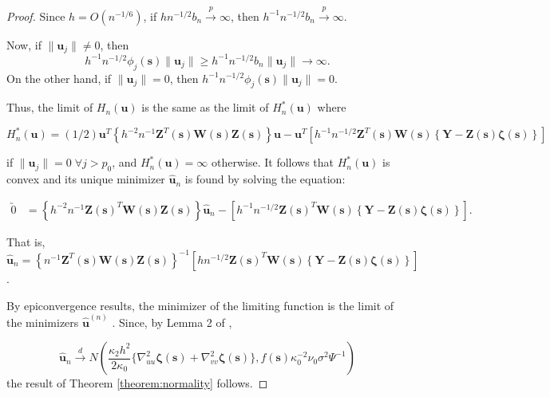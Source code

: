\documentclass[authoryear,review, 12pt]{elsarticle}
\begin{document}
\begin{proof}
Since $h=O(n^{-1/6})$, if $hn^{-1/2}b_{n}\xrightarrow{p}\infty$,
then $h^{-1}n^{-1/2}b_{n}\xrightarrow{p}\infty$.

Now, if $\|\bm{u}_{j}\|\ne0$, then 
\[
h^{-1}n^{-1/2}\phi_{j}(\bm{s})\|\bm{u}_{j}\|\ge h^{-1}n^{-1/2}b_{n}\|\bm{u}_{j}\|\to\infty.
\]
On the other hand, if $\|\bm{u}_{j}\|=0$, then $h^{-1}n^{-1/2}\phi_{j}(\bm{s})\|\bm{u}_{j}\|=0$.

Thus, the limit of $H_{n}\left(\bm{u}\right)$ is the same as the
limit of $H_{n}^{*}\left(\bm{u}\right)$ where

\[
H_{n}^{*}\left(\bm{u}\right)=(1/2)\bm{u}^{T}\left\{ h^{-2}n^{-1}\bm{Z}^{T}(\bm{s})\bm{W}(\bm{s})\bm{Z}(\bm{s})\right\} \bm{u}-\bm{u}^{T}\left[h^{-1}n^{-1/2}\bm{Z}^{T}(\bm{s})\bm{W}(\bm{s})\left\{ \bm{Y}-\bm{Z}(\bm{s})\bm{\zeta}(\bm{s})\right\} \right]
\]


if $\|\bm{u}_{j}\|=0\;\forall j>p_{0}$, and $H_{n}^{*}\left(\bm{u}\right)=\infty$
otherwise. It follows that $H_{n}^{*}\left(\bm{u}\right)$ is convex
and its unique minimizer $\hat{\bm{u}}_{n}$ is found by solving the
equation:

\begin{align}
\utilde{0} & =\left\{ h^{-2}n^{-1}\bm{Z}\left(\bm{s}\right)^{T}\bm{W}\left(\bm{s}\right)\bm{Z}\left(\bm{s}\right)\right\} \hat{\bm{u}}_{n}-\left[h^{-1}n^{-1/2}\bm{Z}\left(\bm{s}\right)^{T}\bm{W}\left(\bm{s}\right)\left\{ \bm{Y}-\bm{Z}\left(\bm{s}\right)\bm{\zeta}\left(\bm{s}\right)\right\} \right].\label{eq:limit}
\end{align}


That is, $\hat{\bm{u}}_{n}=\left\{ n^{-1}\bm{Z}^{T}\left(\bm{s}\right)\bm{W}\left(\bm{s}\right)\bm{Z}\left(\bm{s}\right)\right\} ^{-1}\left[hn^{-1/2}\bm{Z}\left(\bm{s}\right)^{T}\bm{W}\left(\bm{s}\right)\left\{ \bm{Y}-\bm{Z}\left(\bm{s}\right)\bm{\zeta}\left(\bm{s}\right)\right\} \right]$.

By epiconvergence results, the minimizer of the limiting function
is the limit of the minimizers $\hat{\bm{u}}^{(n)}$ \citep{Geyer-1994,Knight-Fu-2000}.
Since, by Lemma 2 of \citet{Sun-Yan-Zhang-Lu-2014},

\begin{equation}
\hat{\bm{u}}_{n}\xrightarrow{d}N\left(\frac{\kappa_{2}h^{2}}{2\kappa_{0}}\{\nabla_{uu}^{2}\bm{\zeta}(\bm{s})+\nabla_{vv}^{2}\bm{\zeta}(\bm{s})\},f(\bm{s})\kappa_{0}^{-2}\nu_{0}\sigma^{2}\Psi^{-1}\right)
\end{equation}
the result of Theorem \ref{theorem:normality} follows.
\end{proof}
\end{document}

